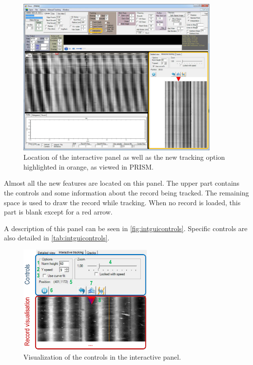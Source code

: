 \begin{figure}[!ht]
\centering
\includegraphics[width=0.9\textwidth]{images/int-right-panel}
\caption[Location of the interactive panel in PRISM.]
{Location of the interactive panel as well as the new tracking option highlighted in orange, as viewed in PRISM.}
\label{fig:intpanel}
\end{figure}

Almost all the new features are located on this panel. The upper part contains the controls and some information about the record being tracked. The remaining space is used to draw the record while tracking. When no record is loaded, this part is blank except for a red arrow.

A description of this panel can be seen in \autoref{fig:intguicontrols}. Specific controls are also detailed in \autoref{tab:intguicontrols}.

\begin{figure}[!ht]
\centering
\includegraphics[width=0.6\textwidth]{images/int-track-controls}
\caption{Visualization of the controls in the interactive panel.}
\label{fig:intguicontrols}
\end{figure}

